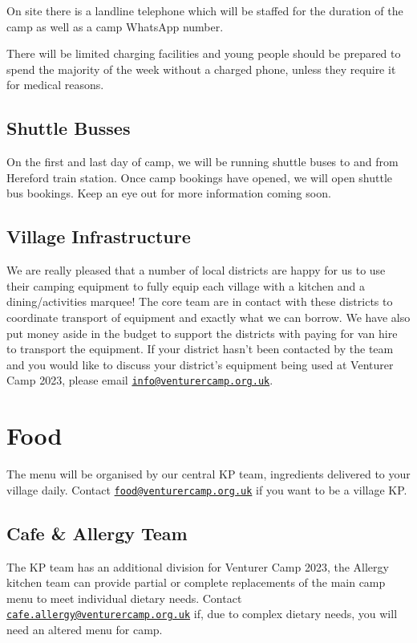 \documentclass[a4paper, 10pt]{report}
\begin{document}
On site there is a landline telephone which will be staffed for the duration of the camp as well as a camp WhatsApp number.

There will be limited charging facilities and young people should be prepared to spend the majority of the week without a charged phone, unless they require it for medical reasons.
\section{Shuttle Busses}
On the first and last day of camp, we will be running shuttle buses to and from Hereford train station. Once camp bookings have opened, we will open shuttle bus bookings. Keep an eye out for more information coming soon.
\section{Village Infrastructure}
We are really pleased that a number of local districts are happy for us to use their camping equipment to fully equip each village with a kitchen and a dining/activities marquee! The core team are in contact with these districts to coordinate transport of equipment and exactly what we can borrow. We have also put money aside in the budget to support the districts with paying for van hire to transport the equipment. If your district hasn't been contacted by the team and you would like to discuss your district's equipment being used at Venturer Camp 2023, please email \href{mailto:info@venturercamp.org.uk}{\texttt{info@venturercamp.org.uk}}.

\chapter{Food}
The menu will be organised by our central KP team, ingredients delivered to your village daily. Contact \href{mailto:food@venturercamp.org.uk}{\texttt{food@venturercamp.org.uk}} if you want to be a village KP.
\section{Cafe \& Allergy Team}
The KP team has an additional division for Venturer Camp 2023, the Allergy kitchen team can provide partial or complete replacements of the main camp menu to meet individual dietary needs. Contact \href{mailto:cafe.allergy@venturercamp.org.uk}{\texttt{cafe.allergy@venturercamp.org.uk}} if, due to complex dietary needs, you will need an altered menu for camp. 
\end{document}
